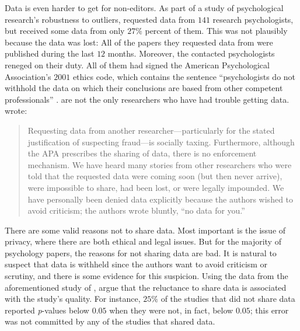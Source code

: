 Data is even harder to get for non-editors. As part of a study of psychological research's robustness to outliers, \textcite{Wicherts2006-yy} requested data from $141$ research psychologists, but received some data from only $27\%$ percent of them. This was not plausibly because the data was lost: All of the papers they requested data from were published during the last $12$ months. Moreover, the contacted psychologists reneged on their duty. All of them had signed the American Psychological Association's $2001$ ethics code, which contains the sentence ``psychologists do not withhold the data on which their conclusions are based from other competent professionals'' \parencite[p. 396; as cited in Wicherts et al. 2006][]{American_Psychological_Association2001-rs}. 
\textcite{Wicherts2006-yy} are not the only researchers who have had trouble getting data. \textcite[p. 526]{Nelson2018-ov} wrote: 
\begin{quote} Requesting data from another researcher---particularly for the stated justification of suspecting fraud---is socially taxing. Furthermore, although the APA prescribes the sharing of data, there is no enforcement mechanism. We have heard many stories from other researchers who were told that the requested data were coming soon (but then never arrive), were impossible to share, had been lost, or were legally impounded. We have personally been denied data explicitly because the authors wished to avoid criticism; the authors wrote bluntly, \textquotedblleft no data for you.''
\end{quote}
There are some valid reasons not to share data. Most important is the issue of privacy, where there are both ethical and legal issues. But for the majority of psychology papers, the reasons for not sharing data are bad. It is natural to suspect that data is withheld since the authors want to avoid criticism or scrutiny, and there is some evidence for this suspicion. Using the data from the aforementioned study of \textcite{Wicherts2006-yy}, \textcite{Wicherts2011-eb} argue that the reluctance to share data is associated with the study's quality. For instance, $25\%$ of the studies that did not share data reported \textit{p}-values below $0.05$ when they were not, in fact, below $0.05$; this error was not committed by any of the studies that shared data.


